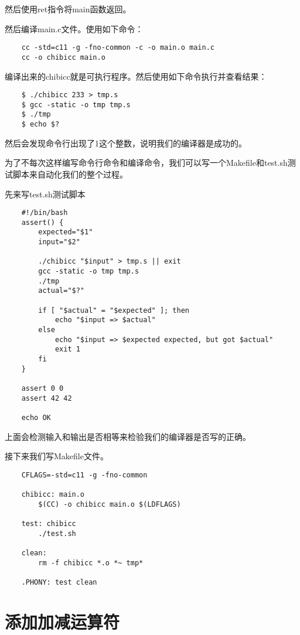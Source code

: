 \documentclass[cn,10pt,math=newtx,citestyle=gb7714-2015,bibstyle=gb7714-2015]{elegantbook}
\begin{document}
然后使用ret指令将main函数返回。

然后编译main.c文件。使用如下命令：

\begin{verbatim}
    cc -std=c11 -g -fno-common -c -o main.o main.c
    cc -o chibicc main.o
\end{verbatim}

编译出来的chibicc就是可执行程序。然后使用如下命令执行并查看结果：

\begin{verbatim}
    $ ./chibicc 233 > tmp.s
    $ gcc -static -o tmp tmp.s
    $ ./tmp
    $ echo $?
\end{verbatim}

然后会发现命令行出现了1这个整数，说明我们的编译器是成功的。

为了不每次这样编写命令行命令和编译命令，我们可以写一个Makefile和test.sh测试脚本来自动化我们的整个过程。

先来写test.sh测试脚本

\begin{verbatim}
    #!/bin/bash
    assert() {
        expected="$1"
        input="$2"

        ./chibicc "$input" > tmp.s || exit
        gcc -static -o tmp tmp.s
        ./tmp
        actual="$?"

        if [ "$actual" = "$expected" ]; then
            echo "$input => $actual"
        else
            echo "$input => $expected expected, but got $actual"
            exit 1
        fi
    }

    assert 0 0
    assert 42 42

    echo OK
\end{verbatim}

上面会检测输入和输出是否相等来检验我们的编译器是否写的正确。

接下来我们写Makefile文件。

\begin{verbatim}
    CFLAGS=-std=c11 -g -fno-common

    chibicc: main.o
        $(CC) -o chibicc main.o $(LDFLAGS)

    test: chibicc
        ./test.sh

    clean:
        rm -f chibicc *.o *~ tmp*

    .PHONY: test clean
\end{verbatim}

\chapter{添加加减运算符}
\end{document}
